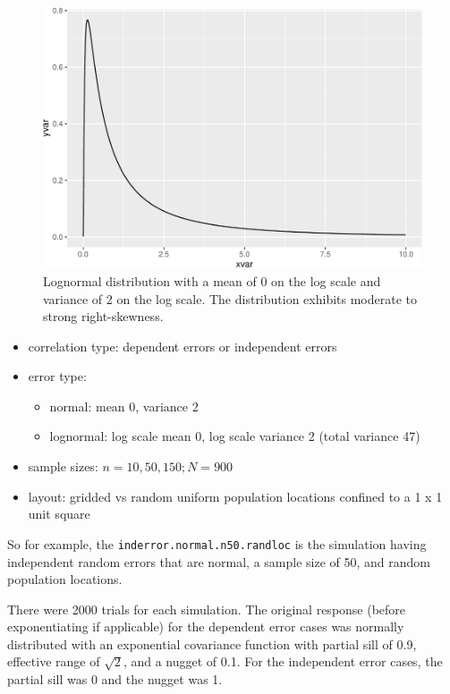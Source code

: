 \documentclass[]{elsarticle} %
\providecommand{\tightlist}{%
  \setlength{\itemsep}{0pt}\setlength{\parskip}{0pt}}
\begin{document}
\begin{figure}
\includegraphics[width=1\linewidth]{SpatialDVM_Manuscript_files/figure-latex/figlog-1} \caption{Lognormal distribution with a mean of 0 on the log scale and variance of 2 on the log scale. The distribution exhibits moderate to strong right-skewness.}\label{fig:figlog}
\end{figure}

\begin{itemize}
\tightlist
\item
  correlation type: dependent errors or independent errors
\item
  error type:

  \begin{itemize}
  \tightlist
  \item
    normal: mean 0, variance 2
  \item
    lognormal: log scale mean 0, log scale variance 2 (total variance
    47)
  \end{itemize}
\item
  sample sizes: \(n = 10, 50, 150; N = 900\)
\item
  layout: gridded vs random uniform population locations confined to a 1
  x 1 unit square
\end{itemize}

So for example, the \texttt{inderror.normal.n50.randloc} is the
simulation having independent random errors that are normal, a sample
size of 50, and random population locations.

There were 2000 trials for each simulation. The original response
(before exponentiating if applicable) for the dependent error cases was
normally distributed with an exponential covariance function with
partial sill of 0.9, effective range of \(\sqrt{2}\), and a nugget of
0.1. For the independent error cases, the partial sill was 0 and the
nugget was 1.
\end{document}

